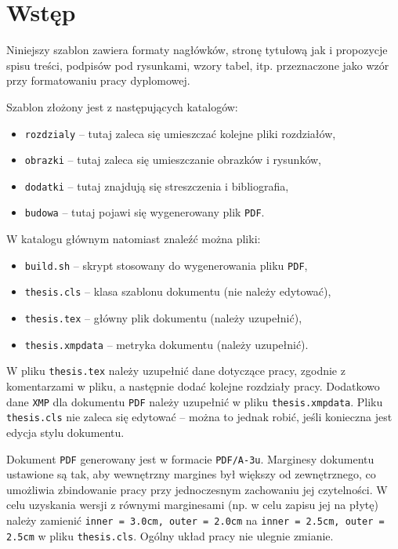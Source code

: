 \chapter{Wstęp}

Niniejszy szablon zawiera formaty nagłówków, stronę tytułową jak i propozycje spisu treści, podpisów pod rysunkami, wzory tabel, itp. przeznaczone jako wzór przy formatowaniu pracy dyplomowej.

Szablon złożony jest z następujących katalogów:
\begin{itemize}
\item \verb|rozdzialy| -- tutaj zaleca się umieszczać kolejne pliki rozdziałów,
\item \verb|obrazki|   -- tutaj zaleca się umieszczanie obrazków i rysunków,
\item \verb|dodatki|   -- tutaj znajdują się streszczenia i bibliografia,
\item \verb|budowa|    -- tutaj pojawi się wygenerowany plik \verb|PDF|.
\end{itemize}

W katalogu głównym natomiast znaleźć można pliki:
\begin{itemize}
\item \verb|build.sh|       -- skrypt stosowany do wygenerowania pliku \verb|PDF|,
\item \verb|thesis.cls|     -- klasa szablonu dokumentu (nie należy edytować),
\item \verb|thesis.tex|     -- główny plik dokumentu (należy uzupełnić),
\item \verb|thesis.xmpdata| -- metryka dokumentu (należy uzupełnić).
\end{itemize}

W pliku \verb|thesis.tex| należy uzupełnić dane dotyczące pracy, zgodnie z komentarzami w pliku, a następnie dodać kolejne rozdziały pracy. Dodatkowo dane \verb|XMP| dla dokumentu \verb|PDF| należy uzupełnić w pliku \verb|thesis.xmpdata|. Pliku \verb|thesis.cls| nie zaleca się edytować -- można to jednak robić, jeśli konieczna jest edycja stylu dokumentu.

Dokument \verb|PDF| generowany jest w formacie \verb|PDF/A-3u|. Marginesy dokumentu ustawione są tak, aby wewnętrzny margines był większy od zewnętrznego, co umożliwia zbindowanie pracy przy jednoczesnym zachowaniu jej czytelności. W celu uzyskania wersji z równymi marginesami (np. w celu zapisu jej na płytę) należy zamienić \verb|inner = 3.0cm, outer = 2.0cm| na \verb|inner = 2.5cm, outer = 2.5cm| w pliku \verb|thesis.cls|. Ogólny układ pracy nie ulegnie zmianie.

